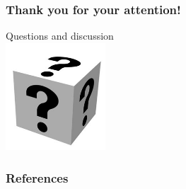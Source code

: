 \documentclass[accentcolor=tud8b,colorbacktitle]{tudbeamer}
\begin{document}
\begin{frame}
\frametitle{Thank you for your attention!}
\begin{center}
	\huge Questions and discussion\\
	\vspace{0,6cm}
	\includegraphics[height=4cm]{assets/faq}
\end{center}
\end{frame}


\begin{frame}[allowframebreaks]
\frametitle{References}


\end{frame}
\end{document}
